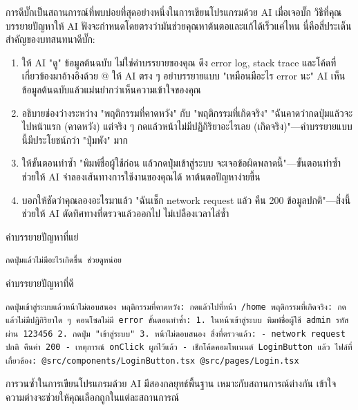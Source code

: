 
การดีบั๊กเป็นสถานการณ์ที่พบบ่อยที่สุดอย่างหนึ่งในการเขียนโปรแกรมด้วย AI เมื่อเจอบั๊ก วิธีที่คุณบรรยายปัญหาให้ AI ฟังจะกำหนดโดยตรงว่ามันช่วยคุณหาต้นตอและแก้ได้เร็วแค่ไหน นี่คือสี่ประเด็นสำคัญของบทสนทนาดีบั๊ก:

\begin{enumerate}
  \item ให้ AI "ดู" ข้อมูลต้นฉบับ ไม่ใช่คำบรรยายของคุณ ดึง error log, stack trace และโค้ดที่เกี่ยวข้องมาอ้างอิงด้วย @ ให้ AI ตรง ๆ อย่าบรรยายแบบ "เหมือนมีอะไร error นะ" AI เห็นข้อมูลต้นฉบับแล้วแม่นยำกว่าเห็นความเข้าใจของคุณ
  \item อธิบายช่องว่างระหว่าง "พฤติกรรมที่คาดหวัง" กับ "พฤติกรรมที่เกิดจริง" "ฉันคาดว่ากดปุ่มแล้วจะไปหน้าแรก (คาดหวัง) แต่จริง ๆ กดแล้วหน้าไม่มีปฏิกิริยาอะไรเลย (เกิดจริง)"—คำบรรยายแบบนี้มีประโยชน์กว่า "ปุ่มพัง" มาก
  \item ให้ขั้นตอนทำซ้ำ "พิมพ์ชื่อผู้ใช้ก่อน แล้วกดปุ่มเข้าสู่ระบบ จะเจอข้อผิดพลาดนี้"—ขั้นตอนทำซ้ำช่วยให้ AI จำลองเส้นทางการใช้งานของคุณได้ หาต้นตอปัญหาง่ายขึ้น
  \item บอกให้ชัดว่าคุณลองอะไรมาแล้ว "ฉันเช็ก network request แล้ว คืน 200 ข้อมูลปกติ"—สิ่งนี้ช่วยให้ AI ตัดทิศทางที่ตรวจแล้วออกไป ไม่เปลืองเวลาไล่ซ้ำ
\end{enumerate}

คำบรรยายปัญหาที่แย่

\begin{lstlisting}
กดปุ่มแล้วไม่มีอะไรเกิดขึ้น ช่วยดูหน่อย
\end{lstlisting}

คำบรรยายปัญหาที่ดี

\begin{lstlisting}
กดปุ่มเข้าสู่ระบบแล้วหน้าไม่ตอบสนอง พฤติกรรมที่คาดหวัง: กดแล้วไปที่หน้า /home พฤติกรรมที่เกิดจริง: กดแล้วไม่มีปฏิกิริยาใด ๆ คอนโซลไม่มี error ขั้นตอนทำซ้ำ: 1. ในหน้าเข้าสู่ระบบ พิมพ์ชื่อผู้ใช้ admin รหัสผ่าน 123456 2. กดปุ่ม "เข้าสู่ระบบ" 3. หน้าไม่ตอบสนอง สิ่งที่ตรวจแล้ว: - network request ปกติ คืนค่า 200 - เหตุการณ์ onClick ผูกไว้แล้ว - เช็กโค้ดคอมโพเนนต์ LoginButton แล้ว ไฟล์ที่เกี่ยวข้อง: @src/components/LoginButton.tsx @src/pages/Login.tsx
\end{lstlisting}


การวนซ้ำในการเขียนโปรแกรมด้วย AI มีสองกลยุทธ์พื้นฐาน เหมาะกับสถานการณ์ต่างกัน เข้าใจความต่างจะช่วยให้คุณเลือกถูกในแต่ละสถานการณ์

